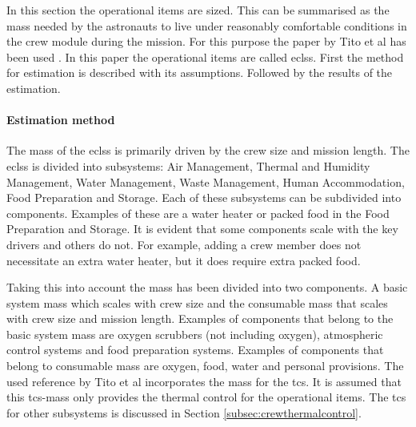 In this section the operational items are sized. This can be summarised as the mass needed by the astronauts to live under reasonably comfortable conditions in the crew module during the mission. For this purpose the paper by Tito et al has been used \cite{Tito2013}. In this paper the operational items are called \acrfull{eclss}. First the method for estimation is described with its assumptions. Followed by the results of the estimation.

\paragraph{Estimation method}
The mass of the \gls{eclss} is primarily driven by the crew size and mission length. The \gls{eclss} is divided into subsystems: Air Management, Thermal and Humidity Management, Water Management, Waste Management, Human Accommodation, Food Preparation and Storage. Each of these subsystems can be subdivided into components. Examples of these are a water heater or packed food in the Food Preparation and Storage. It is evident that some components scale with the key drivers and others do not. For example, adding a crew member does not necessitate an extra water heater, but it does require extra packed food. 


Taking this into account the mass has been divided into two components. A basic system mass which scales with crew size and the consumable mass that scales with crew size and mission length. Examples of components that belong to the basic system mass are oxygen scrubbers (not including oxygen), atmospheric control systems and food preparation systems. Examples of components that belong to consumable mass are oxygen, food, water and personal provisions. The used reference by Tito et al incorporates the mass for the \gls{tcs}. It is assumed that this \gls{tcs}-mass only provides the thermal control for the operational items. The \gls{tcs} for other subsystems is discussed in Section \ref{subsec:crewthermalcontrol}.

